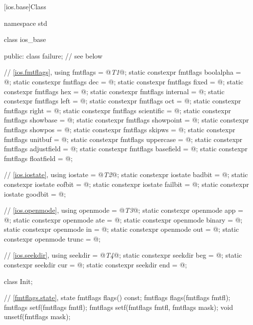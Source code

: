 [ios.base]{Class }
%
\begin{codeblock}
namespace std {
  class ios_base {
  public:
    class failure; // see below

    // \ref{ios.fmtflags}, 
    using fmtflags = @\textit{T1}@;
    static constexpr fmtflags boolalpha = @\unspec@;
    static constexpr fmtflags dec = @\unspec@;
    static constexpr fmtflags fixed = @\unspec@;
    static constexpr fmtflags hex = @\unspec@;
    static constexpr fmtflags internal = @\unspec@;
    static constexpr fmtflags left = @\unspec@;
    static constexpr fmtflags oct = @\unspec@;
    static constexpr fmtflags right = @\unspec@;
    static constexpr fmtflags scientific = @\unspec@;
    static constexpr fmtflags showbase = @\unspec@;
    static constexpr fmtflags showpoint = @\unspec@;
    static constexpr fmtflags showpos = @\unspec@;
    static constexpr fmtflags skipws = @\unspec@;
    static constexpr fmtflags unitbuf = @\unspec@;
    static constexpr fmtflags uppercase = @\unspec@;
    static constexpr fmtflags adjustfield = @\seebelow@;
    static constexpr fmtflags basefield = @\seebelow@;
    static constexpr fmtflags floatfield = @\seebelow@;

    // \ref{ios.iostate}, 
    using iostate = @\textit{T2}@;
    static constexpr iostate badbit = @\unspec@;
    static constexpr iostate eofbit = @\unspec@;
    static constexpr iostate failbit = @\unspec@;
    static constexpr iostate goodbit = @\seebelow@;

    // \ref{ios.openmode}, 
    using openmode = @\textit{T3}@;
    static constexpr openmode app = @\unspec@;
    static constexpr openmode ate = @\unspec@;
    static constexpr openmode binary = @\unspec@;
    static constexpr openmode in = @\unspec@;
    static constexpr openmode out = @\unspec@;
    static constexpr openmode trunc = @\unspec@;

    // \ref{ios.seekdir}, 
    using seekdir = @\textit{T4}@;
    static constexpr seekdir beg = @\unspec@;
    static constexpr seekdir cur = @\unspec@;
    static constexpr seekdir end = @\unspec@;

    class Init;

    // \ref{fmtflags.state},  state
    fmtflags flags() const;
    fmtflags flags(fmtflags fmtfl);
    fmtflags setf(fmtflags fmtfl);
    fmtflags setf(fmtflags fmtfl, fmtflags mask);
    void unsetf(fmtflags mask);

}}
\end{codeblock}
